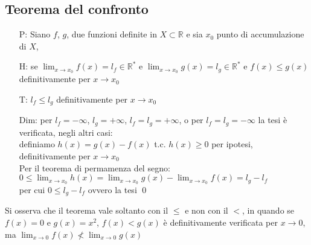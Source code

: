 \documentclass[a4paper]{article}
\begin{document}
\subsection{Teorema del confronto}
\begin{itemize}
	\item[P:] Siano \(f\), \(g\), due funzioni definite in \(X \subset \mathbb{R}\) e sia \(x_0\) punto di accumulazione di \(X\),
	\item[H:] se \(\displaystyle \lim_{x \to x_0} f(x) = l_f \in \mathbb{R}^*\) e \(\displaystyle \lim_{x \to x_0} g(x) = l_g \in \mathbb{R}^*\) e \(f(x) \leq g(x)\) definitivamente per \(x \to x_0\)
	\item[T:] \(l_f \leq l_g\) definitivamente per \(x \to x_0\)
	\item[Dim:] per \(l_f = -\infty\), \(l_g = + \infty\), \(l_f = l_g = + \infty\), o per \(l_f = l_g = - \infty\) la tesi è verificata, negli altri casi: \\
	definiamo \(h(x) = g(x) - f(x)\) t.c. \(h(x) \geq 0\) per ipotesi, definitivamente per \(x \to x_0\) \\
	Per il teorema di permamenza del segno: \(\displaystyle 0 \leq \lim_{x \to x_0} h(x) = \lim_{x \to x_0} g(x) - \lim_{x \to x_0} f(x) = l_g - l_f\) \\
	per cui \(0 \leq l_g - l_f\) ovvero la tesi \qed
\end{itemize}
Si osserva che il teorema vale soltanto con il \(\leq\) e non con il \(<\), in quando se \(f(x) = 0\) e \(g(x) = x^2\),
\(f(x) < g(x)\) è definitivamente verificata per \(x \to 0\), ma \(\displaystyle \lim_{x \to 0} f(x) \nless \lim_{x \to 0} g(x)\)

\newpage
\end{document}
